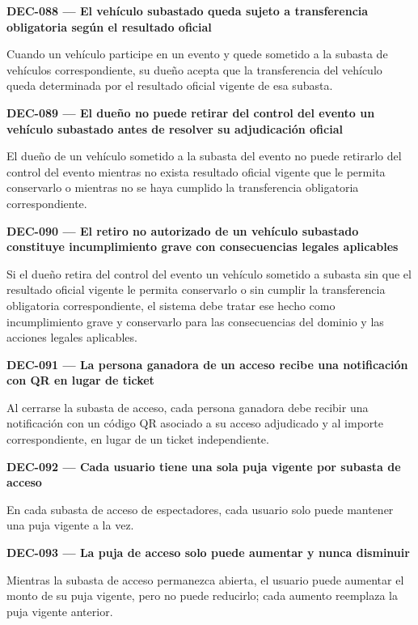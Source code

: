 \documentclass[10pt,letterpaper]{article}
\begin{document}
\noindent\textbf{DEC-088 --- El vehículo subastado queda sujeto a transferencia obligatoria según el resultado oficial}\par
Cuando un vehículo participe en un evento y quede sometido a la subasta de vehículos correspondiente, su dueño acepta que la transferencia del vehículo queda determinada por el resultado oficial vigente de esa subasta.\par\vspace{0.45em}
\noindent\textbf{DEC-089 --- El dueño no puede retirar del control del evento un vehículo subastado antes de resolver su adjudicación oficial}\par
El dueño de un vehículo sometido a la subasta del evento no puede retirarlo del control del evento mientras no exista resultado oficial vigente que le permita conservarlo o mientras no se haya cumplido la transferencia obligatoria correspondiente.\par\vspace{0.45em}
\noindent\textbf{DEC-090 --- El retiro no autorizado de un vehículo subastado constituye incumplimiento grave con consecuencias legales aplicables}\par
Si el dueño retira del control del evento un vehículo sometido a subasta sin que el resultado oficial vigente le permita conservarlo o sin cumplir la transferencia obligatoria correspondiente, el sistema debe tratar ese hecho como incumplimiento grave y conservarlo para las consecuencias del dominio y las acciones legales aplicables.\par\vspace{0.45em}
\noindent\textbf{DEC-091 --- La persona ganadora de un acceso recibe una notificación con QR en lugar de ticket}\par
Al cerrarse la subasta de acceso, cada persona ganadora debe recibir una notificación con un código QR asociado a su acceso adjudicado y al importe correspondiente, en lugar de un ticket independiente.\par\vspace{0.45em}
\noindent\textbf{DEC-092 --- Cada usuario tiene una sola puja vigente por subasta de acceso}\par
En cada subasta de acceso de espectadores, cada usuario solo puede mantener una puja vigente a la vez.\par\vspace{0.45em}
\noindent\textbf{DEC-093 --- La puja de acceso solo puede aumentar y nunca disminuir}\par
Mientras la subasta de acceso permanezca abierta, el usuario puede aumentar el monto de su puja vigente, pero no puede reducirlo; cada aumento reemplaza la puja vigente anterior.\par\vspace{0.45em}
\end{document}
